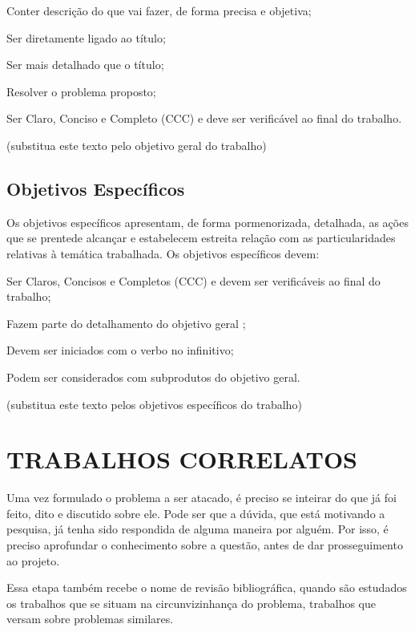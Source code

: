 Conter descrição do que vai fazer, de forma precisa e objetiva;

Ser diretamente ligado ao título;

Ser mais detalhado que o título;

Resolver o problema proposto;

Ser Claro, Conciso e Completo (CCC) e deve ser verificável ao final do trabalho.

(substitua este texto pelo objetivo geral do trabalho)

\subsection{Objetivos Específicos}
\label{subsec:objespc}
Os objetivos específicos apresentam, de forma pormenorizada, detalhada, as ações que se prentede alcançar e estabelecem estreita relação com as particularidades relativas à temática trabalhada. Os objetivos específicos devem:

Ser Claros, Concisos e Completos (CCC) e devem ser verificáveis ao final do trabalho;

Fazem parte do detalhamento do objetivo geral ;

Devem ser iniciados com o verbo no infinitivo;

Podem ser considerados com subprodutos do objetivo geral.

(substitua este texto pelos objetivos específicos do trabalho)

\section{TRABALHOS CORRELATOS}
\label{sec:estadoarte}
Uma vez formulado o problema a ser atacado, é preciso se inteirar do que já foi feito, dito e discutido sobre ele. Pode ser que a dúvida, que está motivando a pesquisa, já tenha sido respondida de alguma maneira por alguém. Por isso, é preciso aprofundar o conhecimento sobre a questão, antes de dar prosseguimento ao projeto.

Essa etapa também recebe o nome de revisão bibliográfica, quando são estudados os trabalhos que se situam na circunvizinhança do problema, trabalhos que versam sobre problemas similares.

